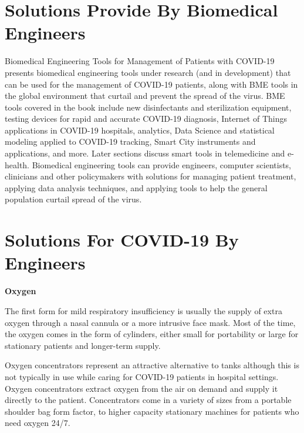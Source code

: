 \documentclass[12pt]{article}
\begin{document}
\section{Solutions Provide By Biomedical Engineers}
\hspace{1cm}
Biomedical Engineering Tools for Management of Patients with COVID-19 presents biomedical engineering tools under research (and in development) that can be used for the management of COVID-19 patients, along with BME tools in the global environment that curtail and prevent the spread of the virus. BME tools covered in the book include new disinfectants and sterilization equipment, testing devices for rapid and accurate COVID-19 diagnosis, Internet of Things applications in COVID-19 hospitals, analytics, Data Science and statistical modeling applied to COVID-19 tracking, Smart City instruments and applications, and more. Later sections discuss smart tools in telemedicine and e-health. Biomedical engineering tools can provide engineers, computer scientists, clinicians and other policymakers with solutions for managing patient treatment, applying data analysis techniques, and applying tools to help the general population curtail spread of the virus.

\clearpage

\section{Solutions For COVID-19 By Engineers}
\hspace{1cm}

\textbf{Oxygen}

\hspace{2cm}


The first form for mild respiratory insufficiency is usually the supply of extra oxygen through a nasal cannula or a more intrusive face mask. Most of the time, the oxygen comes in the form of cylinders, either small for portability or large for stationary patients and longer-term supply.

Oxygen concentrators represent an attractive alternative to tanks although this is not typically in use while caring for COVID-19 patients in hospital settings. Oxygen concentrators extract oxygen from the air on demand and supply it directly to the patient. Concentrators come in a variety of sizes from a portable shoulder bag form factor, to higher capacity stationary machines for patients who need oxygen 24/7.


\hspace{3cm}
\end{document}
